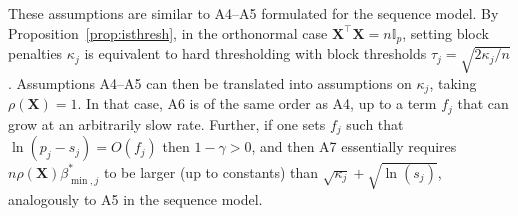 \documentclass[aos]{imsart}
\theoremstyle{plain}
\newcommand{\david}[1]{{\small{\color{blue} \sf $\heartsuit$ David: #1}}}
\newcommand{\paul}[1]{{\small{\color{green} \sf $\spadesuit$ Paul: #1}}}
\newcommand{\I}{\mathbb{I}}
\newcommand{\bs}{\boldsymbol}
\begin{document}
These assumptions are similar to A4--A5 formulated for the sequence model.
 By Proposition~\ref{prop:isthresh}, in the orthonormal 
 case $\bs X^{\top}\bs X=n\I_p$, setting block penalties $\kappa_j$ 
 is equivalent to hard thresholding with block thresholds $\tau_j=\sqrt{2 \kappa_j/n}$.
 Assumptions A4--A5 can then be translated into assumptions on $\kappa_j$, taking $\rho(\bs X)=1$. In that case, A6 is of the same order as A4, up to a term $f_j$ that can grow at an arbitrarily slow rate. %
 Further, if one sets $f_j$ such that $\ln(p_j-s_j)= O(f_j)$ then $1-\gamma > 0$, and then A7 essentially requires $n \rho(\bs X) \beta_{\min,j}^*$ to be larger (up to constants) than $\sqrt{\kappa_j} + \sqrt{\ln(s_j)}$, analogously to A5 in the sequence model. \color{black}
\end{document}
